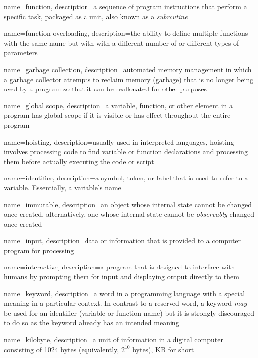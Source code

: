 {
  name=function,
  description={a sequence of program instructions that perform a specific task, packaged as a unit, also
  known as a \emph{subroutine}}
}

{
  name=function overloading,
  description={the ability to define multiple functions with the same name but with with a different number of or different types of parameters}
}

{
  name=garbage collection,
  description={automated memory management in which a garbage collector attempts to reclaim memory (garbage) that is no
	longer being used by a program so that it can be reallocated for other purposes}
}

{
  name=global scope,
  description={a variable, function, or other element in a program has global scope if it is visible or has effect throughout
  	the entire program}
}

{
  name=hoisting,
  description={usually used in interpreted languages, hoisting involves processing code to find variable or function declarations and processing them before actually executing the code or script}
}

{
  name=identifier,
  description={a symbol, token, or label that is used to refer to a variable.  Essentially, a variable's name}
}

{
  name=immutable,
  description={an object whose internal state cannot be changed once created, alternatively, one whose internal state
  cannot be \emph{observably} changed once created}
}

{
  name=input,
  description={data or information that is provided to a computer program for processing}
}

{
  name=interactive,
  description={a program that is designed to interface with humans by prompting them for input and displaying output directly to them}
}

{
  name=keyword,
  description={a word in a programming language with a special meaning in a particular context.  In
	contrast to a reserved word, a keyword \emph{may} be used for an identifier (variable or function name)
	but it is strongly discouraged to do so as the keyword already has an intended meaning}
}

{
  name=kilobyte,
  description={a unit of information in a digital computer consisting of 1024 bytes (equivalently, $2^{10}$ bytes), KB for short}
}

